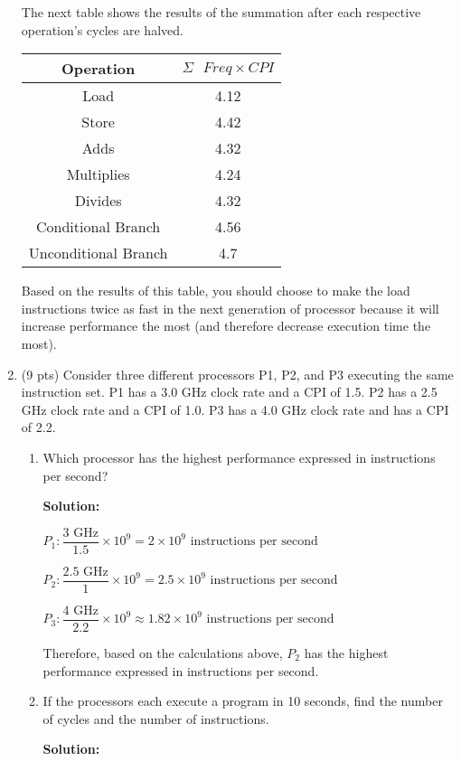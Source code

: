 \documentclass[10pt]{article} %
\begin{document}
\begin{enumerate}
The next table shows the results of the summation after each respective operation's cycles are halved.  
\begin{center}
\begin{tabular}{| c | c |}
\hline
Operation & $\Sigma \text{ } Freq \times CPI$ \\
\hline
Load & 4.12 \\
Store & 4.42 \\
Adds & 4.32 \\
Multiplies & 4.24 \\
Divides & 4.32 \\
Conditional Branch & 4.56 \\
Unconditional Branch & 4.7 \\
\hline
\end{tabular}
\end{center}

Based on the results of this table, you should choose to make the load instructions twice as fast in the next generation of processor because it will increase performance the most (and therefore decrease execution time the most).  

\item 

(9 pts) Consider three different processors P1, P2, and P3 executing the same instruction set. P1 has a 3.0 GHz clock rate and a CPI of 1.5. P2 has a 2.5 GHz clock rate and a CPI of 1.0. P3 has a 4.0 GHz clock rate and has a CPI of 2.2.
\begin{enumerate} [a]
\item Which processor has the highest performance expressed in instructions per second?

\textbf{Solution: }

$P_1: \dfrac{3 \text{ GHz}}{1.5} \times 10^9 = 2 \times 10^9 \text{ instructions per second}$

$P_2: \dfrac{2.5 \text{ GHz}}{1} \times 10^9 = 2.5 \times 10^9 \text{ instructions per second}$

$P_3: \dfrac{4 \text{ GHz}}{2.2} \times 10^9 \approx 1.82 \times 10^9 \text{ instructions per second}$

Therefore, based on the calculations above, $P_2$ has the highest performance expressed in instructions per second.  

\item If the processors each execute a program in 10 seconds, find the number of cycles and the number of instructions.

\textbf{Solution: }


\end{enumerate}
\end{enumerate}
\end{document}
